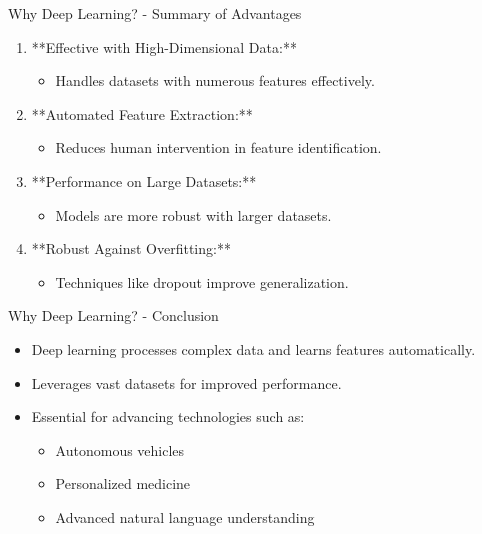 \documentclass[aspectratio=169]{beamer}
\begin{document}
\begin{frame}[fragile]{Why Deep Learning? - Summary of Advantages}
    \begin{enumerate}
        \item **Effective with High-Dimensional Data:**
            \begin{itemize}
                \item Handles datasets with numerous features effectively.
            \end{itemize}

        \item **Automated Feature Extraction:**
            \begin{itemize}
                \item Reduces human intervention in feature identification.
            \end{itemize}

        \item **Performance on Large Datasets:**
            \begin{itemize}
                \item Models are more robust with larger datasets.
            \end{itemize}

        \item **Robust Against Overfitting:**
            \begin{itemize}
                \item Techniques like dropout improve generalization.
            \end{itemize}
    \end{enumerate}
\end{frame}

\begin{frame}[fragile]{Why Deep Learning? - Conclusion}
    \begin{itemize}
        \item Deep learning processes complex data and learns features automatically.
        \item Leverages vast datasets for improved performance.
        \item Essential for advancing technologies such as:
        \begin{itemize}
            \item Autonomous vehicles
            \item Personalized medicine
            \item Advanced natural language understanding
        \end{itemize}
    \end{itemize}
\end{frame}
\end{document}
